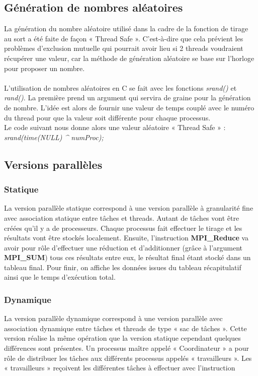 \documentclass[a4paper,12pt]{article}
\begin{document}
\subsection{Génération de nombres aléatoires}
La génération du nombre aléatoire utilisé dans la cadre de la fonction de tirage au sort a été faite de façon « Thread Safe ». C'est-à-dire que cela prévient les problèmes d'exclusion mutuelle qui pourrait avoir lieu si 2 threads voudraient récupérer une valeur, car la méthode de génération aléatoire se base sur l'horloge pour proposer un nombre.\\\\
L'utilisation de nombres aléatoires en C se fait avec les fonctions \textit{srand()} et \textit{rand()}. La première prend un argument qui servira de graine pour la génération de nombre. L'idée est alors de fournir une valeur de temps couplé avec le numéro du thread pour que la valeur soit différente pour chaque processus. \\
Le code suivant nous donne alors une valeur aléatoire « Thread Safe » : \\
\textit{srand(time(NULL) {\large \textasciicircum}  numProc);}


\subsection{Versions parallèles}

\subsubsection{Statique}
La version parallèle statique correspond à une version parallèle à granularité fine avec association statique entre tâches et threads. Autant de tâches vont être créées qu'il y a de processeurs. Chaque processus fait effectuer le tirage et les résultats vont être stockés localement. Ensuite, l'instruction \textbf{MPI\_Reduce} va avoir pour rôle d'effectuer une réduction et d'additionner (grâce à l'argument \textbf{MPI\_SUM}) tous ces résultats entre eux, le résultat final étant stocké dans un tableau final. Pour finir, on affiche les données issues du tableau récapitulatif ainsi que le temps d'exécution total. 

\subsubsection{Dynamique}
La version parallèle dynamique correspond à une version parallèle avec association dynamique entre tâches et threads de type « sac de tâches ». Cette version réalise la même opération que la version statique cependant quelques différences sont présentes. Un processus maître appelé « Coordinateur » a pour rôle de distribuer les tâches aux différents processus appelés « travailleurs ». Les « travailleurs » reçoivent les différentes tâches à effectuer avec l'instruction 
\end{document}
